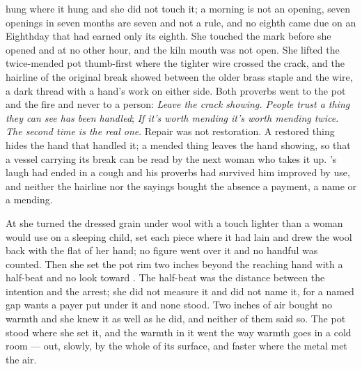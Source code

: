  hung where it hung and she did not touch it; a morning is not an opening, seven openings in seven months are seven and not a rule, and no eighth came due on an Eighthday that had earned only its eighth. She touched the mark before she opened  and at no other hour, and the kiln mouth was not open. She lifted the twice-mended pot thumb-first where the tighter wire crossed the crack, and the hairline of the original break showed between the older brass staple and the wire, a dark thread with a hand's work on either side. Both proverbs went to the pot and the fire and never to a person: \emph{Leave the crack showing. People trust a thing they can see has been handled}; \emph{If it's worth mending it's worth mending twice. The second time is the real one}. Repair was not restoration. A restored thing hides the hand that handled it; a mended thing leaves the hand showing, so that a vessel carrying its break can be read by the next woman who takes it up. 's laugh had ended in a cough and his proverbs had survived him improved by use, and neither the hairline nor the sayings bought the absence a payment, a name or a mending.

At  she turned the dressed grain under wool with a touch lighter than a woman would use on a sleeping child, set each piece where it had lain and drew the wool back with the flat of her hand; no figure went over it and no handful was counted. Then she set the pot rim two inches beyond the reaching hand with a half-beat and no look toward . The half-beat was the distance between the intention and the arrest; she did not measure it and did not name it, for a named gap wants a payer put under it and none stood. Two inches of air bought no warmth and she knew it as well as he did, and neither of them said so. The pot stood where she set it, and the warmth in it went the way warmth goes in a cold room --- out, slowly, by the whole of its surface, and faster where the metal met the air.

\scenebreak

